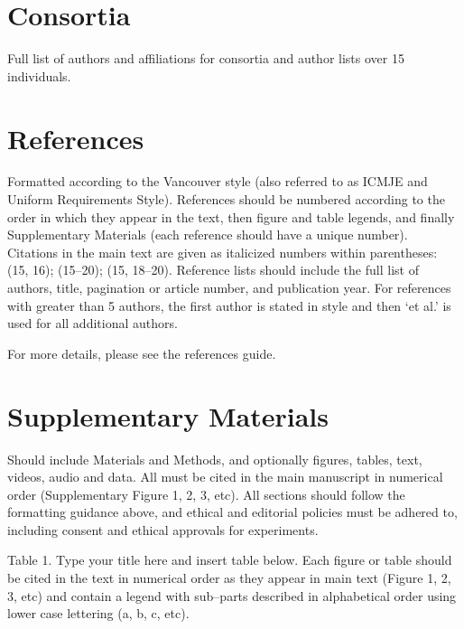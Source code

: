 \documentclass[12pt]{Definitions/academia}
\begin{document}
\section*{Consortia}

Full list of authors and affiliations for consortia and author lists over 15 individuals.

\section*{References}
Formatted according to the Vancouver style (also referred to as ICMJE and Uniform Requirements Style). References should be numbered according to the order in which they appear in the text, then figure and table legends, and finally Supplementary Materials (each reference should have a unique number). Citations in the main text are given as italicized numbers within parentheses: (15, 16); (15--20); (15, 18--20). Reference lists should include the full list of authors, title, pagination or article number, and publication year. For references with greater than 5 authors, the first author is stated in style and then `et al.' is used for all additional authors.

For more details, please see the references guide.

\section*{Supplementary Materials}

Should include Materials and Methods, and optionally figures, tables, text, videos, audio and data. All must be cited in the main manuscript in numerical order (Supplementary Figure 1, 2, 3, etc). All sections should follow the formatting guidance above, and ethical and editorial policies must be adhered to, including consent and ethical approvals for experiments.

Table 1. Type your title here and insert table below. Each figure or table should be cited in the text in numerical order as they appear in main text (Figure 1, 2, 3, etc) and contain a legend with sub--parts described in alphabetical order using lower case lettering (a, b, c, etc).
\end{document}
